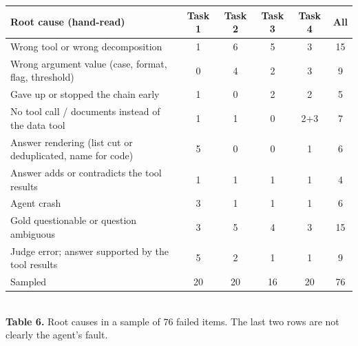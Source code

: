 \documentclass[10pt]{article}
\begin{document}
\begin{center}\small
\begin{tabular}{@{}lccccc@{}}
\toprule
Root cause (hand-read) & Task 1 & Task 2 & Task 3 & Task 4 & All \\
\midrule
Wrong tool or wrong decomposition                         & 1 & 6 & 5 & 3 & 15 \\
Wrong argument value (case, format, flag, threshold)      & 0 & 4 & 2 & 3 & 9 \\
Gave up or stopped the chain early                        & 1 & 0 & 2 & 2 & 5 \\
No tool call / documents instead of the data tool          & 1 & 1 & 0 & 2+3 & 7 \\
Answer rendering (list cut or deduplicated, name for code) & 5 & 0 & 0 & 1 & 6 \\
Answer adds or contradicts the tool results               & 1 & 1 & 1 & 1 & 4 \\
Agent crash                                               & 3 & 1 & 1 & 1 & 6 \\
\midrule
Gold questionable or question ambiguous                   & 3 & 5 & 4 & 3 & 15 \\
Judge error; answer supported by the tool results         & 5 & 2 & 1 & 1 & 9 \\
\midrule
Sampled                                                   & 20 & 20 & 16 & 20 & 76 \\
\bottomrule
\end{tabular}\\[0.2em]
{\footnotesize \textbf{Table 6.} Root causes in a sample of 76 failed items. The last two rows are
not clearly the agent's fault.}
\end{center}
\end{document}
